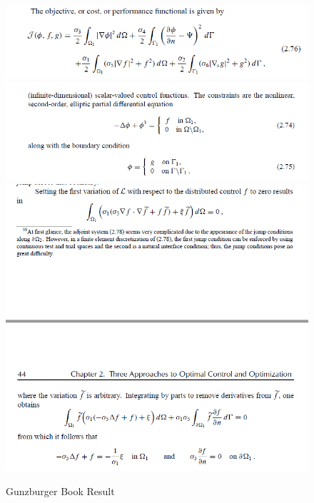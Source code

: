 \documentclass[11pt, a4paper]{article}
\theoremstyle{definition}
\begin{document}
	\begin{figure}[h]
		\centering
		\includegraphics[scale=0.8]{Cost.png}
		\includegraphics[scale=0.8]{Constraint.png}
		\includegraphics[scale=0.8]{GradientEqn.png}
		\caption{Gunzburger Book Result} 
		\label{F1}
	\end{figure}
\end{document}
